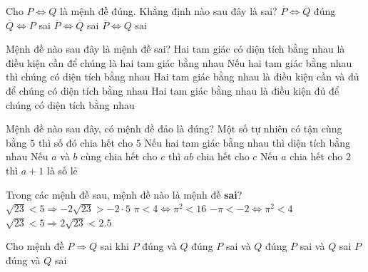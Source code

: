 \begin{ex}%
	 Cho $P \Leftrightarrow Q$ là mệnh đề đúng. Khẳng định nào sau đây là sai?
	\choice 
		{$\overline{P} \Leftrightarrow \overline{Q}$ đúng} 
		{$\overline{Q} \Leftrightarrow P$ sai} 
		{\True $\overline{P} \Leftrightarrow \overline{Q}$ sai} 
		{$\overline{P} \Leftrightarrow Q$ sai} 
\end{ex}

\begin{ex}%
	Mệnh đề nào sau  đây là mệnh đề sai?
	 \choice
		{Hai tam giác có diện tích bằng nhau là  điều kiện cần để chúng là hai tam giác bằng nhau}
		{Nếu hai tam giác bằng nhau thì chúng có diện tích  bằng nhau}
		{\True Hai tam giác bằng nhau là điều kiện cần và đủ để chúng có  diện tích bằng nhau}
		{Hai tam giác bằng nhau  là điều kiện đủ để chúng có diện tích bằng nhau}
\end{ex}

\begin{ex}%
	 Mệnh đề nào sau đây, có mệnh đề đảo là đúng?
	 \choice
		{Một số tự  nhiên có tận cùng bằng $5$ thì số đó chia hết cho $5$}
		{Nếu  hai tam giác bằng nhau thì diện tích bằng nhau}
		{Nếu  $a$ và $b$ cùng chia hết cho $c$ thì $ab$ chia hết cho $c$}
		{\True Nếu $a$ chia hết  cho $2$ thì $a+1$ là số lẻ}
\end{ex}

\begin{ex}%
	Trong các mệnh đề sau, mệnh đề  nào là mệnh đề \textbf{sai}?
	\choice 
		{$\sqrt{23}<5 \Rightarrow  -2\sqrt{23}>-2 \cdot 5$}
		{$\pi<4 \Leftrightarrow  \pi^{2}<16$}
		 {\True $-\pi<-2 \Leftrightarrow \pi^{2}<4$}
		 {$\sqrt{23}<5 \Rightarrow 2\sqrt{23}<2.5$}
\end{ex}

\begin{ex}%
	Cho mệnh đề $P \Rightarrow Q$  sai khi
	\choice 
		{$P$ đúng và  $Q$ đúng}
		{$P$ sai  và $Q$ đúng}
		{$P$ sai và $Q$ sai} 
		{\True $P$ đúng và $Q$ sai} 
\end{ex}


